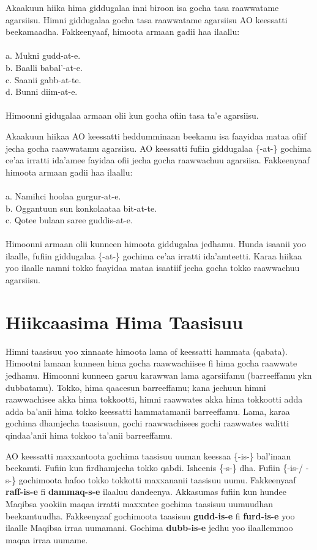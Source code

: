 \documentclass[11pt,b5paper]{book}
\begin{document}
Akaakuun hiika hima giddugalaa inni biroon isa gocha tasa raawwatame agarsiisu. Himni giddugalaa gocha tasa raawwatame agarsiisu AO keessatti beekamaadha. Fakkeenyaaf, himoota armaan gadii haa ilaallu:\\
\\
a. Mukni gudd-at-e.\\
b. Baalli babal'-at-e.\\
c. Saanii gabb-at-te.\\
d. Bunni diim-at-e.\\
\\
Himoonni gidugalaa armaan olii kun gocha ofiin tasa ta'e agarsiisu. 

Akaakuun hiikaa AO keessatti heddumminaan beekamu isa faayidaa mataa ofiif jecha gocha raawwatamu agarsiisu. AO keessatti fufiin giddugalaa \{-at-\} gochima ce'aa irratti ida'amee fayidaa ofii jecha gocha raawwachuu agarsiisa. Fakkeenyaaf himoota armaan gadii haa ilaallu:\\
\\
a. Namihci hoolaa gurgur-at-e.\\
b. Oggantuun sun konkolaataa bit-at-te.\\
c. Qotee bulaan saree guddis-at-e.\\
\\
Himoonni armaan olii kunneen himoota giddugalaa jedhamu. Hunda isaanii yoo ilaalle, fufiin giddugalaa \{-at-\} gochima ce'aa irratti ida'amteetti. Karaa hiikaa yoo ilaalle namni tokko faayidaa mataa isaatiif jecha gocha tokko raawwachuu agarsiisu.

\section{Hiikcaasima Hima Taasisuu}

Himni taasisuu  yoo xinnaate himoota lama of keessatti hammata (qabata). Himootni lamaan kunneen hima gocha raawwachiisee fi hima gocha raawwate jedhamu. Himoonni kunneen garuu karawwan lama agarsiifamu (barreeffamu ykn dubbatamu). Tokko, hima qaacesun barreeffamu; kana jechuun himni raawwachisee akka hima tokkootti, himni raawwates akka hima tokkootti adda adda ba’anii hima tokko keessatti hammatamanii barreeffamu. Lama, karaa gochima dhamjecha taasisuun, gochi raawwachisees gochi raawwates walitti qindaa’anii hima tokkoo ta’anii barreeffamu. 

AO keessatti maxxantoota gochima taasisuu uuman keessaa \{-is-\} bal’inaan beekamti. Fufiin kun firdhamjecha tokko qabdi. Isheenis \{-s-\} dha. Fufiin \{-is-/ -s-\} gochimoota hafoo tokko
tokkotti maxxananii taasisuu uumu. Fakkeenyaaf \textbf{raff-is-e} fi \textbf{dammaq-s-e} ilaaluu dandeenya. Akkasumas fufiin kun hundee Maqibsa yookiin maqaa irratti maxxntee gochima taasisuu uumuudhan beekamtuudha. Fakkeenyaaf gochimoota taasisuu \textbf{gudd-is-e} fi \textbf{furd-is-e} yoo ilaalle Maqibsa irraa uumamani. Gochima \textbf{dubb-is-e} jedhu yoo ilaallemmoo maqaa irraa uumame. 
\end{document}
